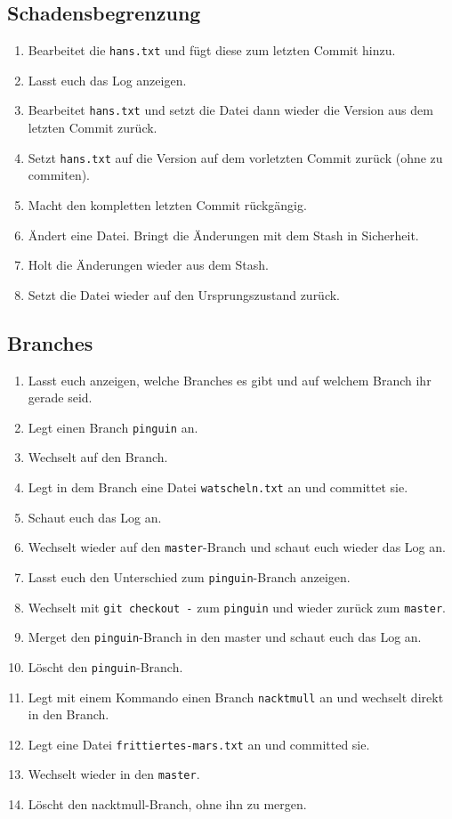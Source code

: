 \documentclass[a4paper,12pt]{scrartcl}
\begin{document}
\subsection{Schadensbegrenzung}
\begin{enumerate}
  \item Bearbeitet die \texttt{hans.txt} und fügt diese zum letzten Commit hinzu.
  \item Lasst euch das Log anzeigen.
  \item Bearbeitet \texttt{hans.txt} und setzt die Datei dann wieder die Version aus dem letzten Commit zurück.
  \item Setzt \texttt{hans.txt} auf die Version auf dem vorletzten Commit zurück (ohne zu commiten).
  \item Macht den kompletten letzten Commit rückgängig.
  \item Ändert eine Datei. Bringt die Änderungen mit dem Stash in Sicherheit.
  \item Holt die Änderungen wieder aus dem Stash.
  \item Setzt die Datei wieder auf den Ursprungszustand zurück.
\end{enumerate}

\subsection{Branches}
\begin{enumerate}
  \item Lasst euch anzeigen, welche Branches es gibt und auf welchem Branch ihr gerade seid.
  \item Legt einen Branch \texttt{pinguin} an.
  \item Wechselt auf den Branch.
  \item Legt in dem Branch eine Datei \texttt{watscheln.txt} an und committet sie.
  \item Schaut euch das Log an.
  \item Wechselt wieder auf den \texttt{master}-Branch und schaut euch wieder das Log an.
  \item Lasst euch den Unterschied zum \texttt{pinguin}-Branch anzeigen.
  \item Wechselt mit \texttt{git checkout -} zum \texttt{pinguin} und wieder zurück zum \texttt{master}.
  \item Merget den \texttt{pinguin}-Branch in den master und schaut euch das Log an.
  \item Löscht den \texttt{pinguin}-Branch.
  \item Legt mit einem Kommando einen Branch \texttt{nacktmull} an und wechselt direkt in den Branch.
  \item Legt eine Datei \texttt{frittiertes-mars.txt} an und committed sie.
  \item Wechselt wieder in den \texttt{master}.
  \item Löscht den {nacktmull}-Branch, ohne ihn zu mergen.
\end{enumerate}
\end{document}
